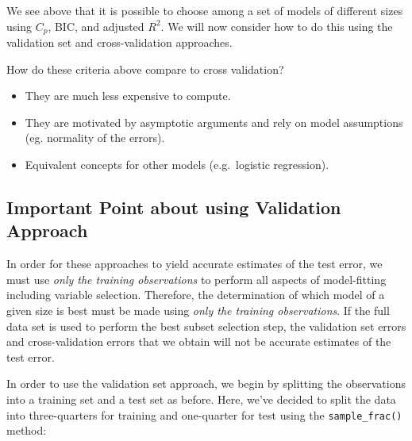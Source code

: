 \documentclass[
]{article}
\newenvironment{Shaded}{\begin{snugshade}}{\end{snugshade}}
\newcommand{\DecValTok}[1]{\textcolor[rgb]{0.00,0.00,0.81}{#1}}
\newcommand{\FloatTok}[1]{\textcolor[rgb]{0.00,0.00,0.81}{#1}}
\newcommand{\KeywordTok}[1]{\textcolor[rgb]{0.13,0.29,0.53}{\textbf{#1}}}
\newcommand{\NormalTok}[1]{#1}
\newcommand{\OperatorTok}[1]{\textcolor[rgb]{0.81,0.36,0.00}{\textbf{#1}}}
\newcommand{\StringTok}[1]{\textcolor[rgb]{0.31,0.60,0.02}{#1}}
\begin{document}
We see above that it is possible to choose among a set of models of
different sizes using \(C_p\), BIC, and adjusted \(R^2\). We will now
consider how to do this using the validation set and cross-validation
approaches.

How do these criteria above compare to cross validation?

\begin{itemize}
\item
  They are much less expensive to compute.
\item
  They are motivated by asymptotic arguments and rely on model
  assumptions (eg. normality of the errors).
\item
  Equivalent concepts for other models (e.g.~logistic regression).
\end{itemize}

\hypertarget{important-point-about-using-validation-approach}{%
\subsection{Important Point about using Validation
Approach}\label{important-point-about-using-validation-approach}}

In order for these approaches to yield accurate estimates of the test
error, we must use \emph{only the training observations} to perform all
aspects of model-fitting including variable selection. Therefore, the
determination of which model of a given size is best must be made using
\emph{only the training observations}. If the full data set is used to
perform the best subset selection step, the validation set errors and
cross-validation errors that we obtain will not be accurate estimates of
the test error.

In order to use the validation set approach, we begin by splitting the
observations into a training set and a test set as before. Here, we've
decided to split the data into three-quarters for training and
one-quarter for test using the \texttt{sample\_frac()} method:

\begin{Shaded}
\end{Shaded}
\end{document}
